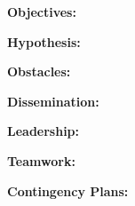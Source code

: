 \documentclass[12pt]{article}
\begin{document}

\textbf{Objectives:}

%
%
%

\bigskip


\textbf{Hypothesis:}

%

\bigskip


\textbf{Obstacles:}

%
%
%

\bigskip


\textbf{Dissemination:}

%
%
%

\bigskip


\textbf{Leadership:}

\bigskip


\textbf{Teamwork:}

\bigskip


\textbf{Contingency Plans:}

%

\bigskip
\end{document}
